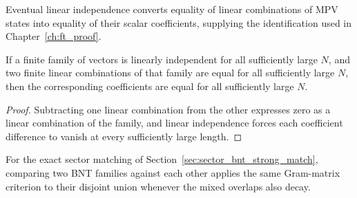 Eventual linear independence converts equality of linear combinations of MPV
states into equality of their scalar coefficients, supplying the identification
used in Chapter~\ref{ch:ft_proof}.

\begin{lemma}%
    \label{lem:eventual_coeff_eq_of_eventual_li}
    \leanok
    If a finite family of vectors is linearly independent for all sufficiently
    large $N$, and two finite linear combinations of that family are equal
    for all sufficiently large $N$, then the corresponding coefficients are
    equal for all sufficiently large $N$.
\end{lemma}

\begin{proof}\leanok
    Subtracting one linear combination from the other expresses zero as a linear
    combination of the family, and linear independence forces each coefficient
    difference to vanish at every sufficiently large length.
\end{proof}

For the exact sector matching of Section~\ref{sec:sector_bnt_strong_match},
comparing two BNT families against each other applies the same Gram-matrix
criterion to their disjoint union whenever the mixed overlaps also decay.
